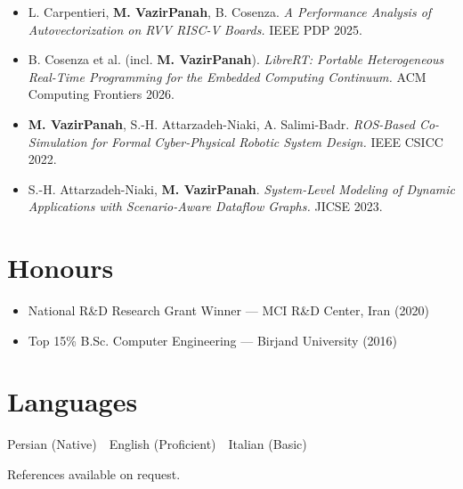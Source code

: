 \documentclass[10pt, a4paper]{article}
\begin{document}
\begin{itemize}
  \item L. Carpentieri, \textbf{M. VazirPanah}, B. Cosenza. \textit{A Performance Analysis of Autovectorization on RVV RISC-V Boards.} IEEE PDP 2025.
  \item B. Cosenza et al. (incl. \textbf{M. VazirPanah}). \textit{LibreRT: Portable Heterogeneous Real-Time Programming for the Embedded Computing Continuum.} ACM Computing Frontiers 2026.
  \item \textbf{M. VazirPanah}, S.-H. Attarzadeh-Niaki, A. Salimi-Badr. \textit{ROS-Based Co-Simulation for Formal Cyber-Physical Robotic System Design.} IEEE CSICC 2022.
  \item S.-H. Attarzadeh-Niaki, \textbf{M. VazirPanah}. \textit{System-Level Modeling of Dynamic Applications with Scenario-Aware Dataflow Graphs.} JICSE 2023.
\end{itemize}

\section{Honours}

\begin{itemize}
  \item National R\&D Research Grant Winner --- MCI R\&D Center, Iran (2020)
  \item Top 15\% B.Sc. Computer Engineering --- Birjand University (2016)
\end{itemize}

\section{Languages}

Persian (Native) \,\textperiodcentered\, English (Proficient) \,\textperiodcentered\, Italian (Basic)

\vspace{6pt}
{\footnotesize\color{midtext}References available on request.}
\end{document}
